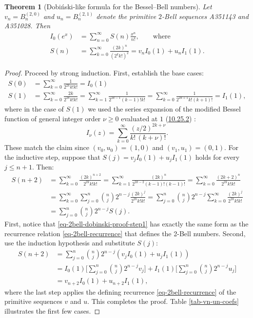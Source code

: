 \documentclass[a4paper]{amsart}
\numberwithin{equation}{section}
\newtheorem{theorem}{Theorem}[section]
\begin{document}
\begin{theorem}[Dobi\'nski-like formula for the Bessel--Bell numbers]\label{thm-bessel-dobiski}
Let $v_n = B^{(2,0)}_n$ and $u_n = B^{(2,1)}_n$ denote the primitive $2$-Bell sequences A351143 and A351028. Then
%
\[
\begin{aligned}
I_0(e^x) &= \sum_{n=0}^\infty S(n) \frac{x^n}{n!}, \qquad \text{where}\\
S(n) &= \sum_{k=0}^{\infty} \frac{(2k)^n}{(2^{k}k!)^2}=v_n I_0(1) + u_n I_1(1).
\end{aligned}
\]
%
\end{theorem}

\begin{proof}
Proceed by strong induction. First, establish the base cases:
%
\[
\begin{aligned}
S(0) &= \sum_{k=0}^{\infty} \frac{1}{2^{2k}k!k!} = I_0(1) \\
S(1) &= \sum_{k=0}^{\infty} \frac{2k}{2^{2k}k!k!} = \sum_{k=1}^{\infty} \frac{1}{2^{2k-1}(k-1)!k!} = \sum_{k=0}^{\infty} \frac{1}{2^{2k+1}k!(k+1)!} = I_1(1),
\end{aligned}
\]
%
where in the case of $S(1)$ we used the series expansion of the modified Bessel function of general integer order $\nu \ge 0$ evaluated at $1$ (\href{https://dlmf.nist.gov/10.25.E2}{10.25.2}) \cite{NIST:DLMF}:
%
\[
I_\nu(z) = \sum_{k=0}^\infty \frac{(z/2)^{2k+\nu}}{k!\,(k+\nu)!}.
\]
%
These match the claim since $(v_0, u_0) = (1,0)$ and $(v_1, u_1) = (0,1)$. For the inductive step, suppose that $S(j) = v_j I_0(1) + u_j I_1(1)$ holds for every $j \leq n+1$. Then:
%
\begin{equation}\label{eq-2bell-dobinski-proof-step1}
\begin{aligned}
S(n+2) &= \sum_{k=0}^{\infty} \frac{(2k)^{n+2}}{2^{2k}k!k!} = \sum_{k=1}^{\infty} \frac{(2k)^{n}}{2^{2k-2}(k-1)!(k-1)!} = \sum_{k=0}^{\infty} \frac{(2k+2)^{n}}{2^{2k}k!k!}\\
&= \sum_{k=0}^{\infty}\sum_{j=0}^{n} \binom{n}{j}2^{n-j}\frac{(2k)^j}{2^{2k}k!k!} = \sum_{j=0}^{n}\binom{n}{j}2^{n-j} \sum_{k=0}^{\infty}\frac{(2k)^j}{2^{2k}k!k!} \\
&= \sum_{j=0}^{n}\binom{n}{j}2^{n-j} S(j).
\end{aligned}
\end{equation}
%
First, notice that \eqref{eq-2bell-dobinski-proof-step1} has exactly the same form as the recurrence relation \eqref{eq-2bell-recurrence} that defines the 2-Bell numbers. Second, use the induction hypothesis and substitute $S(j)$:
%
\[
\begin{aligned}
S(n+2) &= \sum_{j=0}^{n}\binom{n}{j}2^{n-j} (v_j I_0(1)+u_j I_1(1)) \\
&= I_0(1)\bigg[\sum_{j=0}^{n}\binom{n}{j}2^{n-j}v_j\bigg] + I_1(1)\bigg[\sum_{j=0}^{n}\binom{n}{j}2^{n-j}u_j\bigg] \\
&= v_{n+2}I_0(1)+u_{n+2}I_1(1),
\end{aligned}
\]
%
where the last step applies the defining recurrence \eqref{eq-2bell-recurrence} of the primitive sequences $v$ and $u$. This completes the proof. Table \ref{tab-vn-un-coefs} illustrates the first few cases.
\end{proof}
\end{document}
